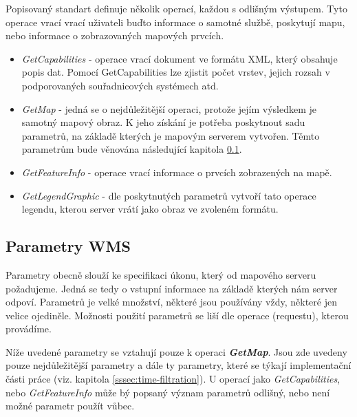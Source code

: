 Popisovaný standart definuje několik operací, každou s odlišným
výstupem. Tyto operace vrací vrací uživateli buďto informace o
samotné službě, poskytují mapu, nebo informace o zobrazovaných
mapových prvcích.

\begin{itemize}

\item\textit{GetCapabilities} - operace vrací dokument ve formátu XML,
  který obsahuje popis dat.
  Pomocí GetCapabilities lze zjistit počet vrstev, jejich
  rozsah v podporovaných souřadnicových systémech atd.
	
\item\textit{GetMap} - jedná se o nejdůležitější operaci, protože
  jejím výsledkem je samotný mapový obraz. K jeho
  získání je potřeba poskytnout sadu parametrů, na základě kterých je
  mapovým serverem vytvořen. Těmto parametrům bude věnována následující
  kapitola \ref{sssec:wms-param}.
	
\item\textit{GetFeatureInfo} - operace vrací informace o prvcích
  zobrazených na mapě.
	
\item\textit{GetLegendGraphic} - dle poskytnutých parametrů vytvoří
  tato operace legendu, kterou server vrátí jako obraz ve zvoleném
  formátu.
\end{itemize}

\subsection{Parametry WMS}
\label{sssec:wms-param}

Parametry obecně slouží ke specifikaci úkonu, který od mapového
serveru požadujeme. Jedná se tedy o vstupní informace na základě
kterých nám server odpoví. Parametrů je velké množství, některé jsou
používány vždy, některé jen velice ojediněle. Možnosti použití
parametrů se liší dle operace (requestu), kterou provádíme.

Níže uvedené parametry se vztahují pouze k operaci
\textbf{\textit{GetMap}}. Jsou zde uvedeny pouze nejdůležitější parametry a dále ty parametry, které se týkají implementační části práce (viz. kapitola \ref{sssec:time-filtration}). U operací jako \textit{GetCapabilities},
nebo \textit{GetFeatureInfo} může bý popsaný význam parametrů odlišný,
nebo není možné parametr použít vůbec.

